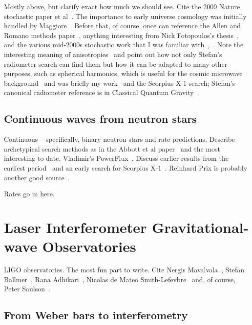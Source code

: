 		Mostly above, but clarify exact how much we should see. Cite the 2009 Nature stochastic paper et al~\cite{LIGOStochasticNature2009}. The importance to early universe cosmology was initially handled by Maggiore~\cite{Maggiore2000}. Before that, of course, once can reference the Allen and Romano methods paper~\cite{Allen1999}, anything interesting from Nick Fotopoulos's thesis~\cite{FotopoulosThesis}, and the various mid-2000s stochastic work that I was familiar with~\cite{Abbott2006},~\cite{Abbott2007}. Note the interesting meaning of anisotropies~\cite{Allen1997} and point out how not only Stefan's radiometer search can find them but how it can be adapted to many other purposes, such as spherical harmonics, which is useful for the cosmic microwave background~\cite{Muciaccia1997} and was briefly my work~\cite{MeadorsCaltech2007} and the Scorpius X-1 search; Stefan's canonical radiometer reference is in Classical Quantum Gravity~\cite{Radiometer2006}.

        \subsection{Continuous waves from neutron stars}
        \label{continuous_waves}

            Continuous -- specifically, binary neutron stars and rate predictions. Describe archetypical search methods as in the Abbott et al paper~\cite{LSCPulsar2006} and the most interesting to date, Vladimir's PowerFlux~\cite{LSCPowerFlux2009}. Discuss earlier results from the earliest period~\cite{Abbott2004} and an early search for Scorpius X-1~\cite{AbbottPulsar2006}. Reinhard Prix is probably another good source~\cite{Prix2006}.

		Rates go in here.

    \section{Laser Interferometer Gravitational-wave Observatories}
    \label{LIGO}
        
        LIGO observatories. The most fun part to write. Cite Nergis Mavalvala~\cite{MavalvalaThesis}, Stefan Ballmer~\cite{BallmerThesis}, Rana Adhikari~\cite{AdhikariThesis}, Nicolas de Mateo Smith-Lefevbre~\cite{SmithThesis} and, of course, Peter Saulson~\cite{Saulson}.

        \subsection{From Weber bars to interferometry}
        \label{bars_to_interferometry}

